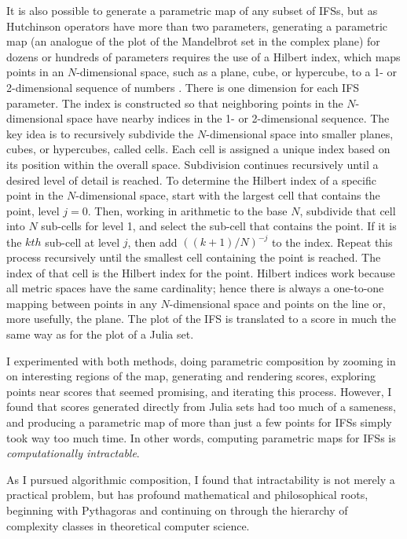 \documentclass[11pt,papersize=a4]{scrartcl}
\begin{document}
It is also possible to generate a parametric map of any subset of IFSs, but as Hutchinson operators have more than two parameters, generating a parametric map (an analogue of the plot of the Mandelbrot set in the complex plane) for dozens or hundreds of parameters requires the use of a Hilbert index, which maps points in an $N$-dimensional space, such as a plane, cube, or hypercube, to a 1- or 2-dimensional sequence of numbers \parencite{patrick1968mapping}. There is one dimension for each IFS parameter. The index is constructed so that neighboring points in the $N$-dimensional space have nearby indices in the 1- or 2-dimensional sequence. The key idea is to recursively subdivide the $N$-dimensional space into smaller planes, cubes, or hypercubes, called cells. Each cell is assigned a unique index based on its position within the overall space. Subdivision continues recursively until a desired level of detail is reached. To determine the Hilbert index of a specific point in the $N$-dimensional space, start with the largest cell that contains the point, level $j = 0$. Then, working in arithmetic to the base $N$, subdivide that cell into $N$ sub-cells for level 1, and select the sub-cell that contains the point. If it is the $kth$ sub-cell at level $j$, then add $((k + 1)/N)^{-j}$ to the index. Repeat this process recursively until the smallest cell containing the point is reached. The index of that cell is  the Hilbert index for the point. Hilbert indices work because all metric spaces have the same cardinality; hence there is always a one-to-one mapping between points in any $N$-dimensional space and points on the line or, more usefully, the plane. The plot of the IFS is translated to a score in much the same way as for the plot of a Julia set.

I experimented with both methods, doing parametric composition by zooming in on interesting regions of the map, generating and rendering scores, exploring points near scores that seemed promising, and iterating this process. However, I found that scores generated directly from Julia sets had too much of a sameness, and producing a parametric map of more than just a few points for IFSs simply took way too much time. In other words, computing parametric maps for IFSs is \emph{computationally intractable}. 

As I pursued algorithmic composition, I found that intractability is not merely a practical problem, but has profound mathematical and philosophical roots, beginning with Pythagoras and continuing on through the hierarchy of complexity classes in theoretical computer science. 
\end{document}
